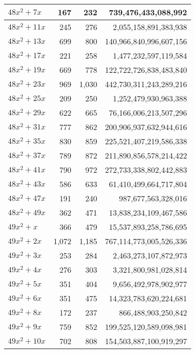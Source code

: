 \documentclass[a4paper]{amsproc}
\theoremstyle{plain}
\theoremstyle{named}
\begin{document}
\begin{longtable}{ | l | r | r | r | }
$48x^2 + 7x$ & 167 & 232 & 739{,}476{,}433{,}088{,}992 \\ \hline
$48x^2 + 11x$ & 245 & 276 & 2{,}055{,}158{,}891{,}383{,}938 \\ \hline
$48x^2 + 13x$ & 699 & 800 & 140{,}966{,}840{,}996{,}607{,}156 \\ \hline
$48x^2 + 17x$ & 221 & 258 & 1{,}477{,}232{,}597{,}119{,}584 \\ \hline
$48x^2 + 19x$ & 669 & 778 & 122{,}722{,}726{,}838{,}483{,}840 \\ \hline
$48x^2 + 23x$ & 969 & 1{,}030 & 442{,}730{,}311{,}243{,}289{,}216 \\ \hline
$48x^2 + 25x$ & 209 & 250 & 1{,}252{,}479{,}930{,}963{,}388 \\ \hline
$48x^2 + 29x$ & 622 & 665 & 76{,}166{,}006{,}213{,}507{,}296 \\ \hline
$48x^2 + 31x$ & 777 & 862 & 200{,}906{,}937{,}632{,}944{,}616 \\ \hline
$48x^2 + 35x$ & 830 & 859 & 225{,}521{,}407{,}219{,}586{,}338 \\ \hline
$48x^2 + 37x$ & 789 & 872 & 211{,}890{,}856{,}578{,}214{,}422 \\ \hline
$48x^2 + 41x$ & 790 & 972 & 272{,}733{,}338{,}802{,}442{,}883 \\ \hline
$48x^2 + 43x$ & 586 & 633 & 61{,}410{,}499{,}664{,}717{,}804 \\ \hline
$48x^2 + 47x$ & 191 & 240 & 987{,}677{,}563{,}328{,}016 \\ \hline
$48x^2 + 49x$ & 362 & 471 & 13{,}838{,}234{,}109{,}467{,}586 \\ \hline
$49x^2 + x$ & 366 & 479 & 15{,}537{,}893{,}258{,}786{,}695 \\ \hline
$49x^2 + 2x$ & 1{,}072 & 1{,}185 & 767{,}114{,}773{,}005{,}526{,}336 \\ \hline
$49x^2 + 3x$ & 253 & 284 & 2{,}463{,}273{,}107{,}872{,}973 \\ \hline
$49x^2 + 4x$ & 276 & 303 & 3{,}321{,}800{,}981{,}028{,}814 \\ \hline
$49x^2 + 5x$ & 351 & 404 & 9{,}656{,}492{,}978{,}902{,}977 \\ \hline
$49x^2 + 6x$ & 351 & 475 & 14{,}323{,}783{,}620{,}224{,}681 \\ \hline
$49x^2 + 8x$ & 172 & 237 & 866{,}488{,}903{,}250{,}842 \\ \hline
$49x^2 + 9x$ & 759 & 852 & 199{,}525{,}120{,}589{,}098{,}981 \\ \hline
$49x^2 + 10x$ & 702 & 808 & 154{,}503{,}887{,}100{,}919{,}297 \\ \hline

\end{longtable}
\end{document}
